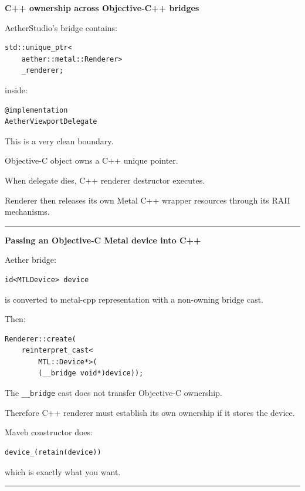 \textbf{C++ ownership across Objective-C++ bridges}

AetherStudio's bridge contains:

\begin{verbatim}
std::unique_ptr<
    aether::metal::Renderer>
    _renderer;
\end{verbatim}

inside:

\begin{verbatim}
@implementation
AetherViewportDelegate
\end{verbatim}

This is a very clean boundary.

Objective-C object owns a C++ unique pointer.

When delegate dies, C++ renderer destructor executes.

Renderer then releases its own Metal C++ wrapper resources through its RAII mechanisms.

\begin{center}\rule{0.5\linewidth}{0.5pt}\end{center}

\textbf{Passing an Objective-C Metal device into C++}

Aether bridge:

\begin{verbatim}
id<MTLDevice> device
\end{verbatim}

is converted to metal-cpp representation with a non-owning bridge cast.

Then:

\begin{verbatim}
Renderer::create(
    reinterpret_cast<
        MTL::Device*>(
        (__bridge void*)device));
\end{verbatim}

The \texttt{\_\_bridge} cast does not transfer Objective-C ownership.

Therefore C++ renderer must establish its own ownership if it stores the device.

Maveb constructor does:

\begin{verbatim}
device_(retain(device))
\end{verbatim}

which is exactly what you want.

\begin{center}\rule{0.5\linewidth}{0.5pt}\end{center}

